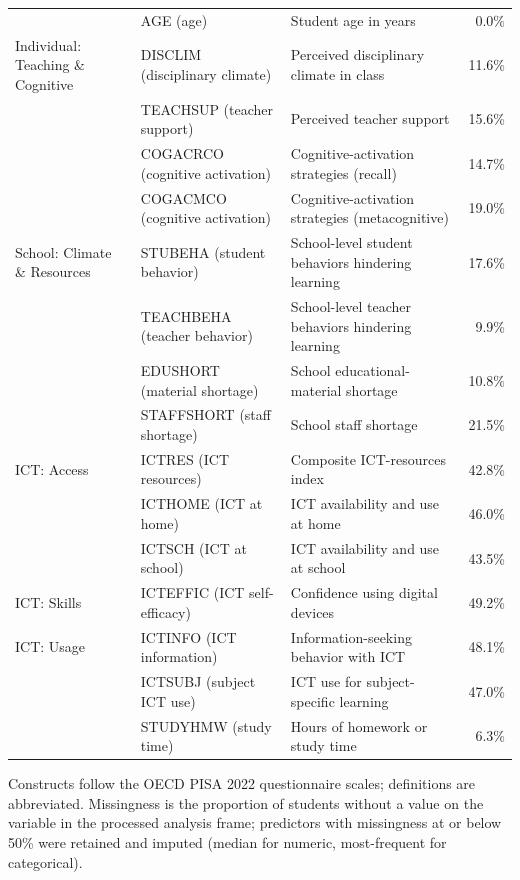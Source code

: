 \documentclass[journal]{IEEEtran}
\begin{document}
\begin{table}[!t]
\begin{tabular}{@{}p{3.0cm}p{5.2cm}p{5.2cm}r@{}}
 & AGE (age) & Student age in years & 0.0\% \\
\addlinespace
Individual: Teaching \& Cognitive & DISCLIM (disciplinary climate) & Perceived disciplinary climate in class & 11.6\% \\
 & TEACHSUP (teacher support) & Perceived teacher support & 15.6\% \\
 & COGACRCO (cognitive activation) & Cognitive-activation strategies (recall) & 14.7\% \\
 & COGACMCO (cognitive activation) & Cognitive-activation strategies (metacognitive) & 19.0\% \\
\addlinespace
School: Climate \& Resources & STUBEHA (student behavior) & School-level student behaviors hindering learning & 17.6\% \\
 & TEACHBEHA (teacher behavior) & School-level teacher behaviors hindering learning & 9.9\% \\
 & EDUSHORT (material shortage) & School educational-material shortage & 10.8\% \\
 & STAFFSHORT (staff shortage) & School staff shortage & 21.5\% \\
\addlinespace
ICT: Access & ICTRES (ICT resources) & Composite ICT-resources index & 42.8\% \\
 & ICTHOME (ICT at home) & ICT availability and use at home & 46.0\% \\
 & ICTSCH (ICT at school) & ICT availability and use at school & 43.5\% \\
\addlinespace
ICT: Skills & ICTEFFIC (ICT self-efficacy) & Confidence using digital devices & 49.2\% \\
\addlinespace
ICT: Usage & ICTINFO (ICT information) & Information-seeking behavior with ICT & 48.1\% \\
 & ICTSUBJ (subject ICT use) & ICT use for subject-specific learning & 47.0\% \\
 & STUDYHMW (study time) & Hours of homework or study time & 6.3\% \\
\bottomrule
\end{tabular}
\vspace{2pt}
{\footnotesize Constructs follow the OECD PISA 2022 questionnaire scales; definitions are abbreviated. Missingness is the proportion of students without a value on the variable in the processed analysis frame; predictors with missingness at or below 50\% were retained and imputed (median for numeric, most-frequent for categorical).}
\end{table}
\end{document}
